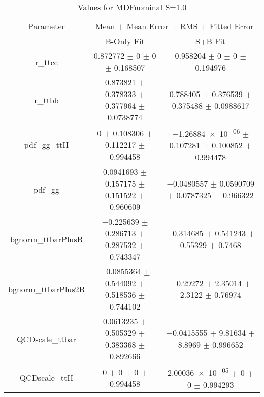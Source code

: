 \begin{table}
\centering
\caption{Values for MDFnominal S=1.0}
\begin{tabular}{ccc}
\toprule
Parameter & \multicolumn{2}{c}{Mean $\pm$ Mean Error $\pm$ RMS $\pm$ Fitted Error}\\
 & B-Only Fit & S+B Fit\\
\midrule
r\_ttcc & \num{0.872772} $\pm$ \num{0} $\pm$ \num{0} $\pm$ \num{0.168507} & \num{0.958204} $\pm$ \num{0} $\pm$ \num{0} $\pm$ \num{0.194976}\\
r\_ttbb & \num{0.873821} $\pm$ \num{0.378333} $\pm$ \num{0.377964} $\pm$ \num{0.0738774} & \num{0.788405} $\pm$ \num{0.376539} $\pm$ \num{0.375488} $\pm$ \num{0.0988617}\\
pdf\_gg\_ttH & \num{0} $\pm$ \num{0.108306} $\pm$ \num{0.112217} $\pm$ \num{0.994458} & \num{-1.26884e-06} $\pm$ \num{0.107281} $\pm$ \num{0.100852} $\pm$ \num{0.994478}\\
pdf\_gg & \num{0.0941693} $\pm$ \num{0.157175} $\pm$ \num{0.151522} $\pm$ \num{0.960609} & \num{-0.0480557} $\pm$ \num{0.0590709} $\pm$ \num{0.0787325} $\pm$ \num{0.966322}\\
bgnorm\_ttbarPlusB & \num{-0.225639} $\pm$ \num{0.286713} $\pm$ \num{0.287532} $\pm$ \num{0.743347} & \num{-0.314685} $\pm$ \num{0.541243} $\pm$ \num{0.55329} $\pm$ \num{0.7468}\\
bgnorm\_ttbarPlus2B & \num{-0.0855364} $\pm$ \num{0.544092} $\pm$ \num{0.518536} $\pm$ \num{0.744102} & \num{-0.29272} $\pm$ \num{2.35014} $\pm$ \num{2.3122} $\pm$ \num{0.76974}\\
QCDscale\_ttbar & \num{0.0613235} $\pm$ \num{0.505329} $\pm$ \num{0.383368} $\pm$ \num{0.892666} & \num{-0.0415555} $\pm$ \num{9.81634} $\pm$ \num{8.8969} $\pm$ \num{0.996652}\\
QCDscale\_ttH & \num{0} $\pm$ \num{0} $\pm$ \num{0} $\pm$ \num{0.994458} & \num{2.00036e-05} $\pm$ \num{0} $\pm$ \num{0} $\pm$ \num{0.994293}\\
\bottomrule
\end{tabular}
\end{table}